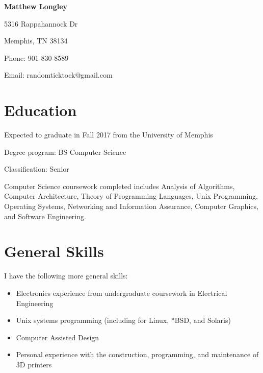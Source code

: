 \documentclass{article}
\begin{document}
\begin{singlespace}
\begin{center}
  \textbf{Matthew Longley}
  
  5316 Rappahannock Dr
  
  Memphis, TN 38134
  
  Phone: 901-830-8589
  
  Email: randomticktock@gmail.com
\end{center}
\begin{flushleft}
  \section*{Education}
  Expected to graduate in Fall 2017 from the University of Memphis

  Degree program: BS Computer Science

  Classification: Senior

  Computer Science coursework completed includes Analysis of Algorithms, Computer Architecture, Theory of Programming Languages, Unix Programming, Operating Systems, Networking and Information Assurance, Computer Graphics, and Software Engineering.
  \section*{General Skills}
  I have the following more general skills:
  \begin{itemize}
  \item Electronics experience from undergraduate coursework in Electrical Engineering
  \item Unix systems programming (including for Linux, *BSD, and Solaris)
  \item Computer Assisted Design
  \item Personal experience with the construction, programming, and maintenance of 3D printers
  \end{itemize}

\end{flushleft}
\end{singlespace}
\end{document}
